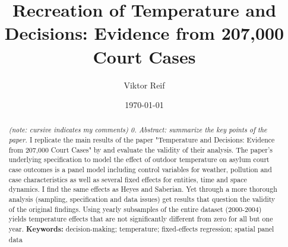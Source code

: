 \documentclass[11pt]{article}
\title{Recreation of Temperature and Decisions: Evidence from 207,000
	Court Cases}
\author{Viktor Reif}
\date{\today}
\begin{document}
	\maketitle
	
	
	\begin{abstract}
		\singlespacing
		\noindent 
		\textit{(note: cursive indicates my comments) 0. Abstract: summarize the key points of the paper.}
		I replicate the main results of the paper "Temperature and Decisions: Evidence from 207,000 Court Cases" by \cite{Heyes.2019} and evaluate the validity of their analysis. The paper's underlying specification to model the effect of outdoor temperature on asylum court case outcomes is a panel model including control variables for weather, pollution and case characteristics as well as several fixed effects for entities, time and space dynamics. I find the same effects as Heyes and Saberian. Yet through a more thorough analysis (sampling, specification and data issues) get results that question the validity of the original findings. Using yearly subsamples of the entire dataset (2000-2004) yields temperature effects that are not significantly different from zero for all but one year.
		\newline \noindent \textbf{Keywords:} decision-making; temperature; fixed-effects regression; spatial panel data
	\end{abstract} \newpage

	
	
\end{document}
